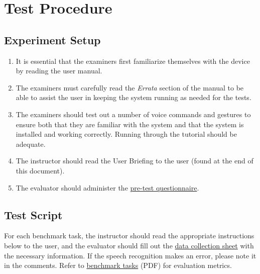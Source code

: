 \documentclass[12pt,letterpaper]{article}
\begin{document}
\section{Test Procedure}

\subsection{Experiment Setup}

\begin{enumerate}
\item It is essential that the examiners first familiarize themselves with the device by reading the user manual.
\item The examiners must carefully read the \textit{Errata} section of the manual to be able to assist the user in keeping the system running as needed for the tests.
\item The examiners should test out a number of voice commands and gestures to ensure both that they are familiar with the system and that the system is installed and working correctly. Running through the tutorial should be adequate.
\item The instructor should read the User Briefing to the user (found at the end of this document).
\item The evaluator should administer the \href{http://fluidsurveys.com/s/hciplayer-pretest/}{pre-test questionnaire}.
\end{enumerate}

\subsection{Test Script}

For each benchmark task, the instructor should read the appropriate instructions below to the user, and the evaluator should fill out the \href{http://fluidsurveys.com/s/hciplayer-datacollectionsheet/}{data collection sheet} with the necessary information. If the speech recognition makes an error, please note it in the comments. Refer to \href{http://www.ece.mcgill.ca/~scormi3/hci/docs/benchmark-tasks.pdf}{benchmark tasks} (PDF) for evaluation metrics.
\end{document}

